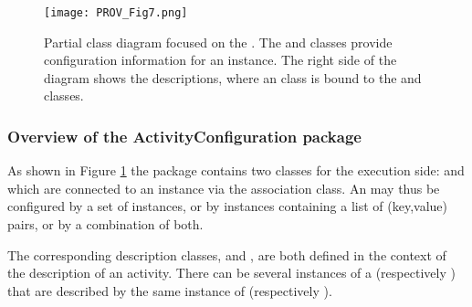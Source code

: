 \begin{figure}[hbt]
\centering
\texttt{[image: PROV\_Fig7.png]}
\caption[Partial class diagram focused on the  package.]{Partial class diagram focused on the . The  and  classes provide configuration information for an  instance. The right side of the diagram shows the descriptions, where an  class is bound to the  and  classes.}
\label{fig:activityconfig}
\end{figure}


\subsubsection{Overview of the ActivityConfiguration package} \label{sec:configurationpackage}

As shown in Figure \ref{fig:activityconfig} the  package contains two classes for the execution side:  and  which are connected to an  instance via the  association class.
An  may thus be configured by a set of  instances, or by  instances containing a list of (key,value) pairs, or by a combination of both. 


The corresponding description classes,  and , are both defined in the context of the description of an activity. 
There can be several instances of a  (respectively ) that are described by the same instance of  (respectively ).



